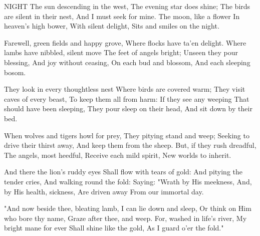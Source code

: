 NIGHT
   The sun descending in the west,
   The evening star does shine;
   The birds are silent in their nest,
   And I must seek for mine.
     The moon, like a flower
     In heaven's high bower,
     With silent delight,
     Sits and smiles on the night.

   Farewell, green fields and happy grove,
   Where flocks have ta'en delight.
   Where lambs have nibbled, silent move
   The feet of angels bright;
     Unseen they pour blessing,
     And joy without ceasing,
     On each bud and blossom,
     And each sleeping bosom.

   They look in every thoughtless nest
   Where birds are covered warm;
   They visit caves of every beast,
   To keep them all from harm:
     If they see any weeping
     That should have been sleeping,
     They pour sleep on their head,
     And sit down by their bed.

   When wolves and tigers howl for prey,
   They pitying stand and weep;
   Seeking to drive their thirst away,
   And keep them from the sheep.
     But, if they rush dreadful,
     The angels, most heedful,
     Receive each mild spirit,
     New worlds to inherit.

   And there the lion's ruddy eyes
   Shall flow with tears of gold:
   And pitying the tender cries,
   And walking round the fold:
     Saying: "Wrath by His meekness,
     And, by His health, sickness,
     Are driven away
     From our immortal day.
     
   "And now beside thee, bleating lamb,
   I can lie down and sleep,
   Or think on Him who bore thy name,
   Graze after thee, and weep.
     For, washed in life's river,
     My bright mane for ever
     Shall shine like the gold,
     As I guard o'er the fold."